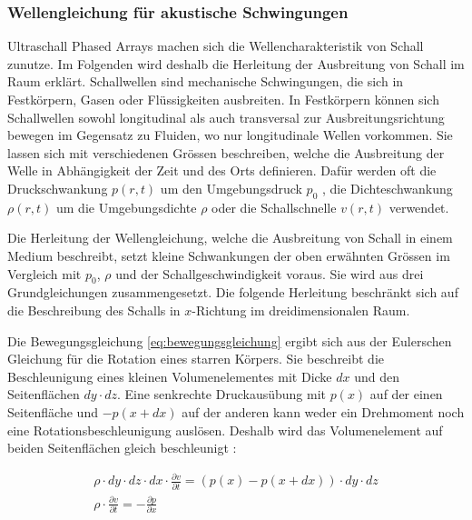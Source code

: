\subsubsection{Wellengleichung für akustische Schwingungen}\label{sec:wellengleichung_fuer_akustische_schwingungen}
Ultraschall Phased Arrays machen sich die Wellencharakteristik von Schall zunutze. Im Folgenden wird deshalb die Herleitung der Ausbreitung von Schall im Raum erklärt. Schallwellen sind mechanische Schwingungen, die sich in Festkörpern, Gasen oder Flüssigkeiten ausbreiten. In Festkörpern können sich Schallwellen sowohl longitudinal als auch transversal zur Ausbreitungsrichtung bewegen im Gegensatz zu Fluiden, wo nur longitudinale Wellen vorkommen.
Sie lassen sich mit verschiedenen Grössen beschreiben, welche die Ausbreitung der Welle in Abhängigkeit der Zeit und des Orts definieren. Dafür werden oft die Druckschwankung $p(r,t)$ um den Umgebungsdruck $p_{0}$ , die Dichteschwankung $\rho(r,t)$ um die Umgebungsdichte $\rho$ oder die Schallschnelle $v(r,t)$ verwendet.

Die Herleitung der Wellengleichung, welche die Ausbreitung von Schall in einem Medium beschreibt, setzt kleine Schwankungen der oben erwähnten Grössen im Vergleich mit $p_{0}$, $\rho$ und der Schallgeschwindigkeit voraus. Sie wird aus drei Grundgleichungen zusammengesetzt. Die folgende Herleitung beschränkt sich auf die Beschreibung des Schalls in $x$-Richtung im dreidimensionalen Raum.

Die Bewegungsgleichung \eqref{eq:bewegungsgleichung} ergibt sich aus der Eulerschen Gleichung für die Rotation eines starren Körpers. Sie beschreibt die Beschleunigung eines kleinen Volumenelementes mit Dicke $dx$ und den Seitenflächen $dy \cdot dz$. Eine senkrechte Druckausübung mit $p(x)$ auf der einen Seitenfläche und $-p(x+dx)$ auf der anderen kann weder ein Drehmoment noch eine Rotationsbeschleunigung auslösen. Deshalb wird das Volumenelement auf beiden Seitenflächen gleich beschleunigt \cite{LOOSER}:

\begin{equation}
\begin{gathered}
\rho \cdot dy\cdot dz \cdot dx \cdot \frac{\partial v}{\partial t} = (p(x)-p(x+dx))\cdot dy\cdot dz\\ \rho \cdot \frac{\partial v}{\partial t} = - \frac{\partial p}{\partial x}
\end{gathered}\label{eq:bewegungsgleichung}
\end{equation}

